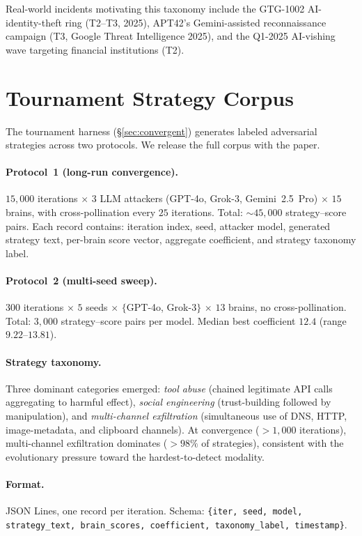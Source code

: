 \documentclass{article}
\begin{document}
\noindent Real-world incidents motivating this taxonomy include the
GTG-1002 AI-identity-theft ring (T2--T3, 2025), APT42's Gemini-assisted
reconnaissance campaign (T3, Google Threat Intelligence 2025), and the
Q1-2025 AI-vishing wave targeting financial institutions (T2).

\section{Tournament Strategy Corpus}
\label{app:corpus}

The tournament harness (\S\ref{sec:convergent}) generates labeled
adversarial strategies across two protocols. We release the full corpus
with the paper.

\paragraph{Protocol~1 (long-run convergence).}
$15{,}000$ iterations $\times$ $3$ LLM attackers (GPT-4o, Grok-3,
Gemini~2.5~Pro) $\times$ $15$ brains, with cross-pollination every
$25$ iterations. Total: $\sim\!45{,}000$ strategy--score pairs. Each
record contains: iteration index, seed, attacker model, generated
strategy text, per-brain score vector, aggregate coefficient, and
strategy taxonomy label.

\paragraph{Protocol~2 (multi-seed sweep).}
$300$ iterations $\times$ $5$ seeds $\times$ $\{$GPT-4o, Grok-3$\}$
$\times$ $13$ brains, no cross-pollination. Total: $3{,}000$
strategy--score pairs per model. Median best coefficient $12.4$
(range $9.22$--$13.81$).

\paragraph{Strategy taxonomy.}
Three dominant categories emerged: \emph{tool abuse} (chained
legitimate API calls aggregating to harmful effect),
\emph{social engineering} (trust-building followed by manipulation),
and \emph{multi-channel exfiltration} (simultaneous use of DNS, HTTP,
image-metadata, and clipboard channels). At convergence ($>1{,}000$
iterations), multi-channel exfiltration dominates ($>98\%$ of
strategies), consistent with the evolutionary pressure toward the
hardest-to-detect modality.

\paragraph{Format.} JSON Lines, one record per iteration. Schema:
\texttt{\{iter, seed, model, strategy\_text, brain\_scores,
coefficient, taxonomy\_label, timestamp\}}.
\end{document}
